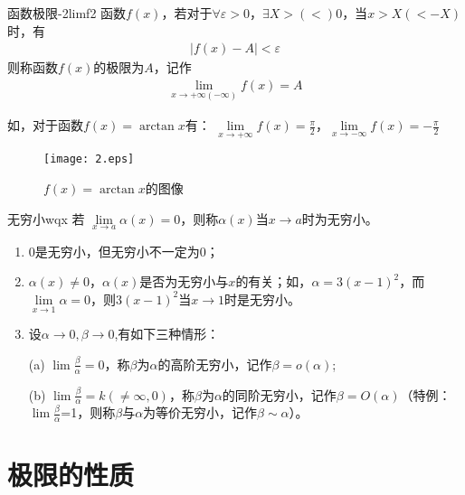 \begin{definition}{函数极限-2}{limf2}
函数$f(x)$，若对于$ \forall\varepsilon>0 $，$ \exists X>(<)0 $，当$ x>X(<-X) $时，有
\begin{align}
    \vert{f(x)-A}\vert<\varepsilon
\end{align}
则称函数$f(x)$的极限为$A$，记作
\begin{align}
    \lim_{x\to +\infty(-\infty)} f(x)=A 
\end{align}
\end{definition}

如，对于函数$f(x)=\arctan{x}$有：
 $\lim\limits_{x\to +\infty} f(x)=\displaystyle\frac{\pi}{2}$，$\lim\limits_{x\to -\infty} f(x)=-\displaystyle \frac{\pi}{2}$

 \begin{figure}[htbp]
    \centering
    \texttt{[image: 2.eps]}
    \caption{$f(x)=\arctan{x}$的图像}
  \end{figure}
  
\begin{definition}{无穷小}{wqx}
若 $ \lim\limits_{x \to a} \alpha(x)=0$，则称$ \alpha(x)$当$x \to a$时为无穷小。
\end{definition}

\begin{note}
\begin{enumerate}
  \item 0是无穷小，但无穷小不一定为0；
  \item $\alpha(x)\neq 0$，$\alpha(x)$是否为无穷小与$ x $的有关；如，$\alpha=3(x-1)^2$，而$\lim\limits_{x \to 1}\alpha=0 $，则$3(x-1)^2$当$x \to 1$时是无穷小。
  \item 设$\alpha \to 0,\beta \to 0$,有如下三种情形：
  
  (a) $\lim \displaystyle\frac{\beta}{\alpha}=0$，称$ \beta $为$ \alpha $的高阶无穷小，记作$\beta=o(\alpha)$;
  
  (b) $\lim \displaystyle\frac{\beta}{\alpha}=k(\neq \infty,0)$，称$ \beta $为$ \alpha $的同阶无穷小，记作$\beta=O(\alpha)$（特例：$\lim \displaystyle\frac{\beta}{\alpha}$=1，则称$ \beta $与$ \alpha $为等价无穷小，记作$\beta \sim \alpha$）。
\end{enumerate}
\end{note}


\section{极限的性质}
